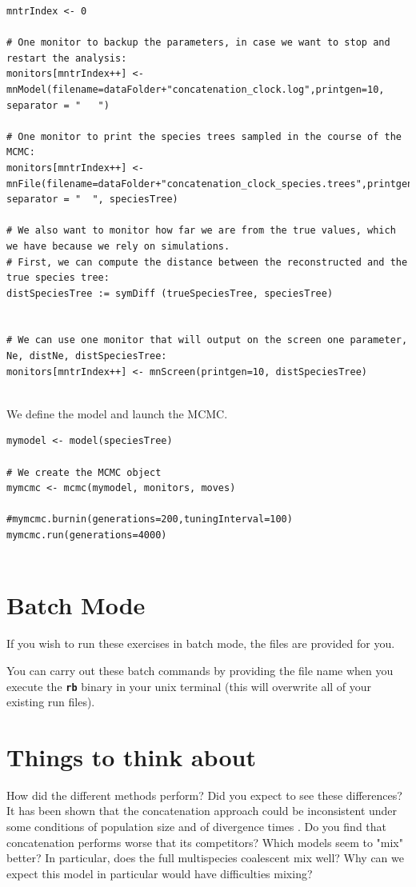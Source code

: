 \documentclass[11pt]{article}
\newcommand{\cl}[1]{{\texttt{\textbf{#1}}}}
\begin{document}
{\begin{framed}
{\begin{snugshade*}
\begin{lstlisting}
mntrIndex <- 0

# One monitor to backup the parameters, in case we want to stop and restart the analysis:
monitors[mntrIndex++] <- mnModel(filename=dataFolder+"concatenation_clock.log",printgen=10, separator = "	")

# One monitor to print the species trees sampled in the course of the MCMC:
monitors[mntrIndex++] <- mnFile(filename=dataFolder+"concatenation_clock_species.trees",printgen=10, separator = "	", speciesTree)

# We also want to monitor how far we are from the true values, which we have because we rely on simulations.
# First, we can compute the distance between the reconstructed and the true species tree:
distSpeciesTree := symDiff (trueSpeciesTree, speciesTree)


# We can use one monitor that will output on the screen one parameter, Ne, distNe, distSpeciesTree:
monitors[mntrIndex++] <- mnScreen(printgen=10, distSpeciesTree)
	
\end{lstlisting}
\end{snugshade*}}
We define the model and launch the MCMC.

 {\tt \begin{snugshade*}
\begin{lstlisting}
mymodel <- model(speciesTree)

# We create the MCMC object
mymcmc <- mcmc(mymodel, monitors, moves)

#mymcmc.burnin(generations=200,tuningInterval=100)
mymcmc.run(generations=4000)


\end{lstlisting}
\end{snugshade*}}

 \end{framed}}

\bigskip


\section{Batch Mode}

If you wish to run these exercises in batch mode, the files are provided for you. 

You can carry out these batch commands by providing the file name when you execute the \cl{rb} binary in your unix terminal (this will overwrite all of your existing run files).
\exs{\cl{\$ rb NameOfTheFile.Rev}}


\section{Things to think about}
How did the different methods perform? 
Did you expect to see these differences?
It has been shown that the concatenation approach could be inconsistent under some conditions of population size and of divergence times \citep{Degnan2006}. 
Do you find that concatenation performs worse that its competitors?
Which models seem to "mix" better?
In particular, does the full multispecies coalescent mix well?
Why can we expect this model in particular would have difficulties mixing?
\end{document}
